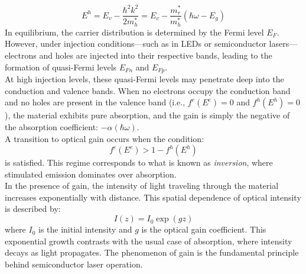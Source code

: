 \begin{equation}
	E^h = E_v - \frac{\hbar^2 k^2}{2 m_h^*} = E_v - \frac{m_r^*}{m_h^*}(\hbar \omega - E_g)
\end{equation}
In equilibrium, the carrier distribution is determined by the Fermi level \( E_F \). However, under injection conditions—such as in LEDs or semiconductor lasers—electrons and holes are injected into their respective bands, leading to the formation of quasi-Fermi levels \( E_{Fn} \) and \( E_{Fp} \).\\
At high injection levels, these quasi-Fermi levels may penetrate deep into the conduction and valence bands. When no electrons occupy the conduction band and no holes are present in the valence band (i.e., \( f^e(E^e) = 0 \) and \( f^h(E^h) = 0 \)), the material exhibits pure absorption, and the gain is simply the negative of the absorption coefficient: \( -\alpha(\hbar \omega) \).\\
A transition to optical gain occurs when the condition:
\begin{equation}
	f^e(E^e) > 1 - f^h(E^h)
\end{equation}
is satisfied. This regime corresponds to what is known as \textit{inversion}, where stimulated emission dominates over absorption.\\
In the presence of gain, the intensity of light traveling through the material increases exponentially with distance. This spatial dependence of optical intensity is described by:
\begin{equation}
	I(z) = I_0 \exp(g z)
\end{equation}
where \( I_0 \) is the initial intensity and \( g \) is the optical gain coefficient. This exponential growth contrasts with the usual case of absorption, where intensity decays as light propagates. The phenomenon of gain is the fundamental principle behind semiconductor laser operation.
